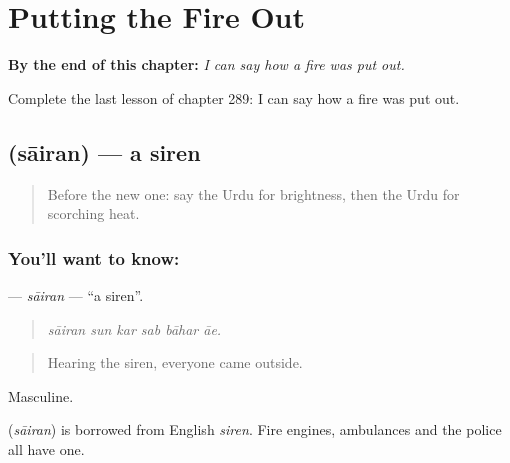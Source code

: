 
\chapter{Putting the Fire Out}
\label{ch:ur-putting-the-fire-out}

\begin{chapteropening}
\textbf{By the end of this chapter:} \emph{I can say how a fire was put out.}

Complete the last lesson of chapter 289: I can say how a fire was put out.
\end{chapteropening}

\section[\texorpdfstring{\ur{سائرن} (sāiran)}{سائرن (sāiran)}]{ (sāiran) — a siren}

\label{lesson:UR-C289-sairan}



\begin{quote}
Before the new one: say the Urdu for brightness, then the Urdu for scorching heat.
\end{quote}

\subsection*{You'll want to know: }
\textbf{} — \emph{sāiran} — \textquotedblleft{}a siren\textquotedblright{}.

\begin{quote}
     
\end{quote}

\begin{quote}
\emph{sāiran sun kar sab bāhar āe.}
\end{quote}

\begin{quote}
Hearing the siren, everyone came outside.
\end{quote}

Masculine.

\begin{cousinweb}
\textbf{} (\emph{sāiran}) is borrowed from English \emph{siren}. Fire engines, ambulances and the police all have one.
\end{cousinweb}

